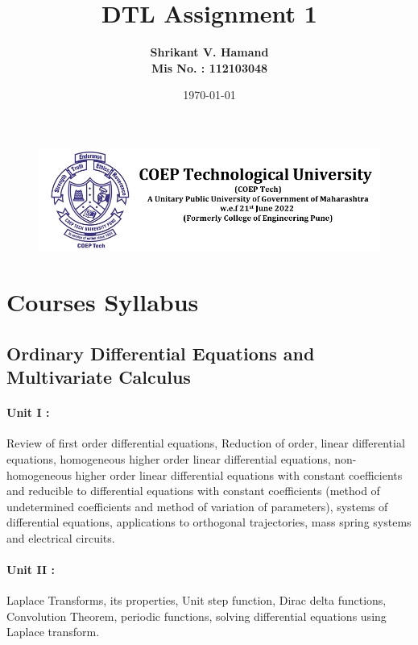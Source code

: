 \documentclass[12pt]{article}
\author{\bf Shrikant V. Hamand \\[10pt] Mis No. : 112103048}
\date{\today}
\begin{document}
\begin{figure}
\centering
\includegraphics[scale=1]{coep_new_logo}
\end{figure}

\title{\huge \bf DTL Assignment 1}
\maketitle
\newpage
\tableofcontents
\newpage
{}
\newpage
{}
\section{Courses Syllabus}

\vspace{1cm}
\subsection{Ordinary Differential Equations and Multivariate Calculus}

\vspace{5pt}
\paragraph{Unit I :} Review of first order differential equations, Reduction of order, linear differential 
equations, homogeneous higher order linear differential equations, non-homogeneous higher 
order linear differential equations with constant coefficients and reducible to differential 
equations with constant coefficients (method of undetermined coefficients and method of 
variation of parameters), systems of differential equations, applications to orthogonal 
trajectories, mass spring systems and electrical circuits.\\[5pt]

\paragraph{Unit II :} Laplace Transforms, its properties, Unit step function, Dirac delta functions, 
Convolution Theorem, periodic functions, solving differential equations using Laplace 
transform.\\[5pt]
\end{document}
